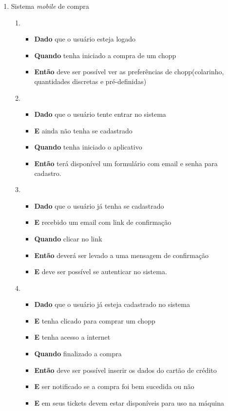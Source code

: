 		\begin{enumerate}

			\item Sistema \textit{mobile} de compra
				\begin{enumerate}
					\item 
						\begin{itemize}
							\item \textbf{Dado} que o usuário esteja logado 
							\item \textbf{Quando} tenha iniciado a compra de um chopp 
							\item \textbf{Então} deve ser possível ver as preferências de chopp(colarinho, quantidades discretas e pré-definidas) 
						\end{itemize}

				\item 
						\begin{itemize}
							\item \textbf{Dado} que o usuário tente entrar no sistema
							\item \textbf{E} ainda não tenha se cadastrado
							\item \textbf{Quando} tenha iniciado o aplicativo 
							\item \textbf{Então} terá disponível um formulário com email e senha para cadastro.
						\end{itemize}

				\item 
						\begin{itemize}
							\item \textbf{Dado} que o usuário já tenha se cadastrado
							\item \textbf{E} recebido um email com link de confirmação
							\item \textbf{Quando} clicar no link
							\item \textbf{Então} deverá ser levado a uma mensagem de confirmação
							\item \textbf{E} deve ser possível se autenticar no sistema.
						\end{itemize}

				\item 
						\begin{itemize}
							\item \textbf{Dado} que o usuário já esteja cadastrado no sistema
							\item \textbf{E} tenha clicado para comprar um chopp
							\item \textbf{E} tenha acesso a internet
							\item \textbf{Quando} finalizado a compra 
							\item \textbf{Então} deve ser possível inserir os dados do cartão de crédito
							\item \textbf{E} ser notificado se a compra foi bem sucedida ou não
							\item \textbf{E} em seus tickets devem estar disponíveis para uso na máquina
						\end{itemize}


\end{enumerate}
\end{enumerate}
